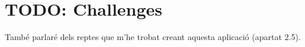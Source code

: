 
\section{TODO: Challenges}

També parlaré dels reptes que m'he trobat creant aquesta aplicació (apartat
2.5).
